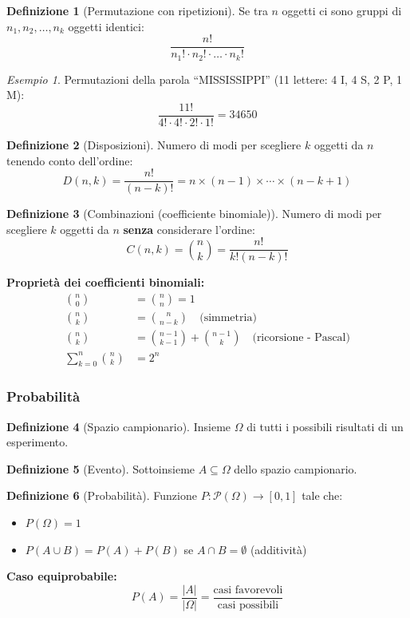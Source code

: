\documentclass[a4paper, 11pt]{article}
\theoremstyle{definition}
\newtheorem{definizione}{Definizione}[section]
\theoremstyle{remark}
\newtheorem{esempio}{Esempio}[section]
\theoremstyle{remark}
\begin{document}
	\begin{definizione}[Permutazione con ripetizioni]
		Se tra $n$ oggetti ci sono gruppi di $n_1, n_2, \ldots, n_k$ oggetti identici:
		\[
		\frac{n!}{n_1! \cdot n_2! \cdot \ldots \cdot n_k!}
		\]
	\end{definizione}
	
	\begin{esempio}
		Permutazioni della parola ``MISSISSIPPI'' (11 lettere: 4 I, 4 S, 2 P, 1 M):
		\[
		\frac{11!}{4! \cdot 4! \cdot 2! \cdot 1!} = 34650
		\]
	\end{esempio}
	
	\begin{definizione}[Disposizioni]
		Numero di modi per scegliere $k$ oggetti da $n$ tenendo conto dell'ordine:
		\[
		D(n,k) = \frac{n!}{(n-k)!} = n \times (n-1) \times \cdots \times (n-k+1)
		\]
	\end{definizione}
	
	\begin{definizione}[Combinazioni (coefficiente binomiale)]
		Numero di modi per scegliere $k$ oggetti da $n$ \textbf{senza} considerare l'ordine:
		\[
		C(n,k) = \binom{n}{k} = \frac{n!}{k!(n-k)!}
		\]
	\end{definizione}
	
	\textbf{Proprietà dei coefficienti binomiali:}
	\begin{align*}
		\binom{n}{0} &= \binom{n}{n} = 1 \\
		\binom{n}{k} &= \binom{n}{n-k} \quad \text{(simmetria)} \\
		\binom{n}{k} &= \binom{n-1}{k-1} + \binom{n-1}{k} \quad \text{(ricorsione - Pascal)} \\
		\sum_{k=0}^{n} \binom{n}{k} &= 2^n
	\end{align*}
	
	\subsubsection{Probabilità}
	
	\begin{definizione}[Spazio campionario]
		Insieme $\Omega$ di tutti i possibili risultati di un esperimento.
	\end{definizione}
	
	\begin{definizione}[Evento]
		Sottoinsieme $A \subseteq \Omega$ dello spazio campionario.
	\end{definizione}
	
	\begin{definizione}[Probabilità]
		Funzione $P: \mathcal{P}(\Omega) \to [0,1]$ tale che:
		\begin{itemize}
			\item $P(\Omega) = 1$
			\item $P(A \cup B) = P(A) + P(B)$ se $A \cap B = \emptyset$ (additività)
		\end{itemize}
		
		\textbf{Caso equiprobabile:}
		\[
		P(A) = \frac{|A|}{|\Omega|} = \frac{\text{casi favorevoli}}{\text{casi possibili}}
		\]
	\end{definizione}
	
\end{document}

